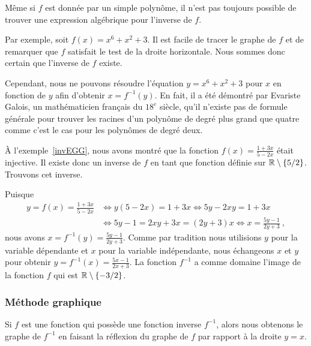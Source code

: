 {\begin{egg}
Même si $f$ est donnée par un simple polynôme, il n'est pas toujours
possible de trouver une expression algébrique pour l'inverse de $f$.

Par exemple, soit $f(x) = x^6 + x^2 + 3$.  Il est facile de tracer le
graphe de $f$ et de remarquer que $f$ satisfait le test de la droite
horizontale.  Nous sommes donc certain que l'inverse de $f$ existe.

Cependant, nous ne pouvons résoudre l'équation $y=x^6+x^2+3$ pour $x$
en fonction de $y$ afin d'obtenir $x = f^{-1}(y)$.  En fait, il a été
démontré par Evariste Galois, un mathématicien français du $18^e$
siècle, qu'il n'existe pas de formule générale pour trouver les
racines d'un polynôme de degré plus grand que quatre comme c'est le
cas pour les polynômes de degré deux.
\end{egg}

\begin{egg}
À l'exemple~\ref{invEGG}, nous avons montré que la fonction
$\displaystyle f(x) = \frac{1+3x}{5-2x}$ était injective.  Il existe
donc un inverse de $f$ en tant que fonction définie sur
$\mathbb{R}\setminus \{5/2\}$.  Trouvons cet inverse.

Puisque
\begin{align*}
y = f(x) = \frac{1+3x}{5-2x} &
\Leftrightarrow y(5-2x) = 1+3x \Leftrightarrow 5y -2xy = 1 + 3x \\
&\Leftrightarrow 5y -1 = 2xy + 3x = (2y+3)x
\Leftrightarrow x = \frac{5y -1}{2y+3} \ ,
\end{align*}
nous avons $\displaystyle x=f^{-1}(y) = \frac{5y -1}{2y+3}$.  Comme par
tradition nous utilisions $y$ pour la variable dépendante et $x$
pour la variable indépendante, nous échangeons $x$ et $y$ pour obtenir
$\displaystyle y=f^{-1}(x) = \frac{5x -1}{2x+3}$.  La fonction
$f^{-1}$ a comme domaine l'image de la fonction $f$ qui est
$\mathbb{R} \setminus \{-3/2\}$.
\end{egg}

\subsubsection{Méthode graphique}

\begin{focus}{\mth}
Si $f$ est une fonction qui possède une fonction inverse $f^{-1}$,
alors nous obtenons le graphe de $f^{-1}$ en faisant la réflexion du
graphe de $f$ par rapport à la droite $y=x$.
\end{focus}

}
